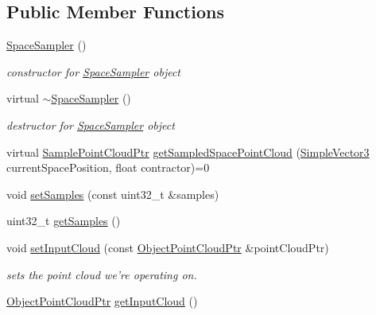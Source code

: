 \subsection*{\-Public \-Member \-Functions}
\begin{DoxyCompactItemize}
\item 
\hyperlink{classnext__best__view_1_1SpaceSampler_a673bf8ba80b977d803cd921c23a4bb6b}{\-Space\-Sampler} ()
\begin{DoxyCompactList}\small\item\em constructor for \hyperlink{classnext__best__view_1_1SpaceSampler}{\-Space\-Sampler} object \end{DoxyCompactList}\item 
virtual \hyperlink{classnext__best__view_1_1SpaceSampler_a62d868b54a1dcd8de6c2e624f335fc1f}{$\sim$\-Space\-Sampler} ()
\begin{DoxyCompactList}\small\item\em destructor for \hyperlink{classnext__best__view_1_1SpaceSampler}{\-Space\-Sampler} object \end{DoxyCompactList}\item 
virtual \hyperlink{namespacenext__best__view_a6351e8a1adb34a715016b1768ad51120}{\-Sample\-Point\-Cloud\-Ptr} \hyperlink{classnext__best__view_1_1SpaceSampler_a0213aa3d023846cb9daee94cc9e1e109}{get\-Sampled\-Space\-Point\-Cloud} (\hyperlink{namespacenext__best__view_a59fc75b908e198bc02a9b19ba88edf12}{\-Simple\-Vector3} current\-Space\-Position, float contractor)=0
\item 
void \hyperlink{classnext__best__view_1_1SpaceSampler_a49f695fd72c33dfeb7bea4caf7a65145}{set\-Samples} (const uint32\-\_\-t \&samples)
\item 
uint32\-\_\-t \hyperlink{classnext__best__view_1_1SpaceSampler_af5451f2ea7ca63bf5cafb0590591d4a4}{get\-Samples} ()
\item 
void \hyperlink{classnext__best__view_1_1SpaceSampler_a3af6c8aaf1466552ae21b9de35ef7649}{set\-Input\-Cloud} (const \hyperlink{namespacenext__best__view_af8b3b448f67ab117bb7c59bc7c34f0b3}{\-Object\-Point\-Cloud\-Ptr} \&point\-Cloud\-Ptr)
\begin{DoxyCompactList}\small\item\em sets the point cloud we're operating on. \end{DoxyCompactList}\item 
\hyperlink{namespacenext__best__view_af8b3b448f67ab117bb7c59bc7c34f0b3}{\-Object\-Point\-Cloud\-Ptr} \hyperlink{classnext__best__view_1_1SpaceSampler_ac3d7505e708c13d1ef922e2e594665d7}{get\-Input\-Cloud} ()

\end{DoxyCompactItemize}
